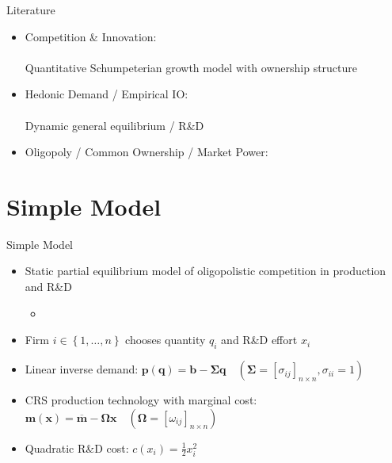 \documentclass[
  10pt,
  aspectratio=169,   %
]{beamer}
\theoremstyle{plain}
\begin{document}
\begin{frame}{Literature}
  \begin{itemize}
    \item Competition \& Innovation: \\
          {\footnotesize\citet{d-Aspremont1988-je,Kamien1992-la,Aghion2001-yc,Aghion2005-vw,Acemoglu2012-bj,Aghion2013-nq,Bloom2013-pn,Lopez2019-sl,Peters2020-sd,Akcigit2021-ns,Akcigit2023-zl,Liu2022-iw,Cavenaile2023-lo,Anton2023-ej,Anton2024-pw,Kini2024-kd,Hopenhayn2024-ya}}\\
          \alert{Quantitative Schumpeterian growth model with ownership structure}
    \item Hedonic Demand / Empirical IO: \\
          {\footnotesize\citet{Lancaster1966-sg,Rosen1974-ep,Berry1995-lx,Nevo2001-ja,Pellegrino2024-dn,Ederer2024-rw}}\\
          \alert{Dynamic general equilibrium / R\&D}
    \item Oligopoly / Common Ownership / Market Power: \\
          {\footnotesize\citet{Rubinstein1983-pi,Rotemberg1984-jz,Neary2003-sn,Atkeson2008-zc,Gutierrez2017-wl,He2017-ix,Azar2018-cc,Azar2022-cn,Autor2020-mr,Baqaee2020-eb,De_Loecker2020-jn,Azar2021-uh,Edmond2023-bg}}
  \end{itemize}
\end{frame}

\section{Simple Model}

\begin{frame}{Simple Model}
  \begin{itemize}
    \item Static partial equilibrium model of oligopolistic competition in production and R\&D
    \begin{itemize}
      \item {\footnotesize \citet{d-Aspremont1988-je,Kamien1992-la,Leahy1997-xr,Lopez2019-sl,Anton2024-pw}} %
    \end{itemize}
    \medskip{}
    \item Firm $i\in \left\{1,\ldots, n\right\}$ chooses quantity $q_i$ and R\&D effort $x_i$
    \medskip{}
    \item Linear inverse demand: $\bm{p}(\bm{q}) = \bm{b} - \bm{\Sigma} \bm{q} \quad (\bm{\Sigma} =[\sigma_{ij}]_{n \times n}, \sigma_{ii} = 1)$
    \medskip{}
    \item CRS production technology with marginal cost: $\bm{m}(\bm{x}) = \overline{\bm{m}} - \bm{\Omega} \bm{x} \quad (\bm{\Omega} =[\omega_{ij}]_{n \times n})$
    \medskip{}
    \item Quadratic R\&D cost: $c(x_i) = \frac{1}{2}x_i^2$
  \end{itemize}
\end{frame}
\end{document}
